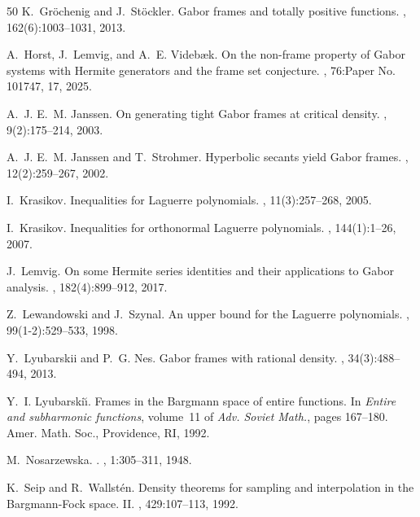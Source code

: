 \documentclass[11pt]{amsart}
\numberwithin{equation}{section}
\begin{document}
\begin{thebibliography}{50}
K.~Gr\"{o}chenig and J.~St\"{o}ckler.
\newblock Gabor frames and totally positive functions.
, 162(6):1003--1031, 2013.

A.~Horst, J.~Lemvig, and A.~E. Videbæk.
\newblock On the non-frame property of {G}abor systems with {H}ermite generators and the frame set conjecture.
, 76:Paper No. 101747, 17, 2025.

A.~J. E.~M. Janssen.
\newblock On generating tight {G}abor frames at critical density.
, 9(2):175--214, 2003.

A.~J. E.~M. Janssen and T.~Strohmer.
\newblock Hyperbolic secants yield {G}abor frames.
, 12(2):259--267, 2002.

I.~Krasikov.
\newblock Inequalities for {L}aguerre polynomials.
, 11(3):257--268, 2005.

I.~Krasikov.
\newblock Inequalities for orthonormal {L}aguerre polynomials.
, 144(1):1--26, 2007.

J.~Lemvig.
\newblock On some {H}ermite series identities and their applications to {G}abor analysis.
, 182(4):899--912, 2017.

Z.~Lewandowski and J.~Szynal.
\newblock An upper bound for the {L}aguerre polynomials.
, 99(1-2):529--533, 1998.

Y.~Lyubarskii and P.~G. Nes.
\newblock Gabor frames with rational density.
, 34(3):488--494, 2013.

Y.~I. Lyubarski\u{\i}.
\newblock Frames in the {B}argmann space of entire functions.
\newblock In {\em Entire and subharmonic functions}, volume~11 of {\em Adv. Soviet Math.}, pages 167--180. Amer. Math. Soc., Providence, RI, 1992.

M.~Nosarzewska.
.
, 1:305--311, 1948.

K.~Seip and R.~Wallst\'{e}n.
\newblock Density theorems for sampling and interpolation in the {B}argmann-{F}ock space. {II}.
, 429:107--113, 1992.


\end{thebibliography}
\end{document}

